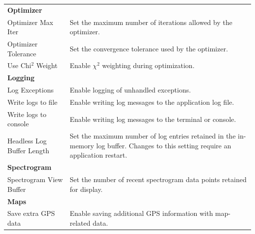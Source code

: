 \begin{longtable}{p{} p{}}
    \multicolumn{2}{l}{\textbf{Optimizer}} \\

    Optimizer Max Iter &
        Set the maximum number of iterations allowed by the optimizer. \\

    Optimizer Tolerance &
        Set the convergence tolerance used by the optimizer. \\

    Use Chi$^2$ Weight &
        Enable $\chi^2$ weighting during optimization. \\


    \multicolumn{2}{l}{\textbf{Logging}} \\

    Log Exceptions &
        Enable logging of unhandled exceptions. \\

    Write logs to file &
        Enable writing log messages to the application log file. \\

    Write logs to console &
        Enable writing log messages to the terminal or console. \\

    Headless Log Buffer Length &
        Set the maximum number of log entries retained in the in-memory
        log buffer. Changes to this setting require an application restart. \\


    \multicolumn{2}{l}{\textbf{Spectrogram}} \\

    Spectrogram View Buffer &
        Set the number of recent spectrogram data points retained for
        display. \\


    \multicolumn{2}{l}{\textbf{Maps}} \\

    Save extra GPS data &
        Enable saving additional GPS information with map-related data. \\

\end{longtable}
